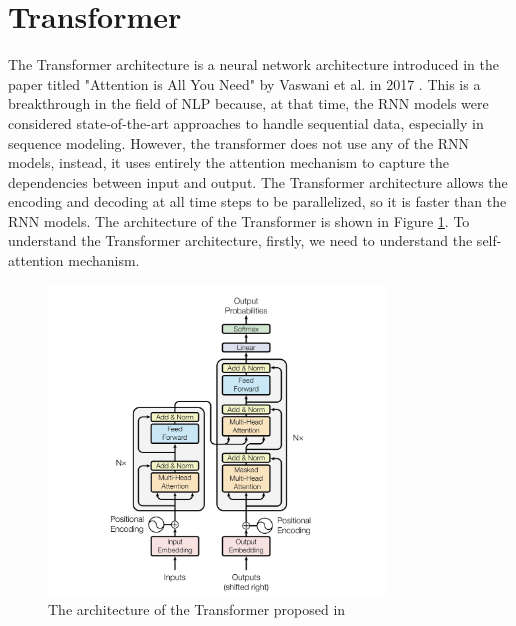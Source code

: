 \section{Transformer}
The Transformer architecture is a neural network architecture introduced in the paper titled "Attention is All You Need" by Vaswani et al. in 2017 \cite{attentionIsAllYouNeed}. This is a breakthrough in the field of NLP because, at that time, the RNN models were considered state-of-the-art approaches to handle sequential data, especially in sequence modeling. However, the transformer does not use any of the RNN models, instead, it uses entirely the attention mechanism to capture the dependencies between input and output. The Transformer architecture allows the encoding and decoding at all time steps to be parallelized, so it is faster than the RNN models. The architecture of the Transformer is shown in Figure \ref{fig:transformer_architecture}. To understand the Transformer architecture, firstly, we need to understand the self-attention mechanism.

\begin{figure}[ht]
    \centering
    \includegraphics[width=0.8\textwidth]{Images/5.Theoretical_Background/transformer_architecture.png}
    \caption{The architecture of the Transformer proposed in \cite{attentionIsAllYouNeed}}
    \label{fig:transformer_architecture}
\end{figure}

